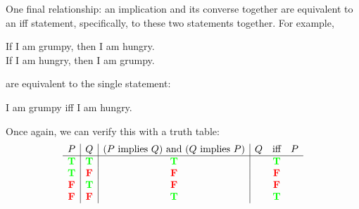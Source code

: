 One final relationship: an implication and its converse together are
equivalent to an iff statement, specifically, to these two statements
together.  For example,
%
\begin{center}
If I am grumpy, then I am hungry. \\
If I am hungry, then I am grumpy.
\end{center}
%
are equivalent to the single statement:
%
\begin{center}
I am grumpy iff I am hungry.
\end{center}
%
Once again, we can verify this with a truth table:
%
\[
\begin{array}{c|c|c|c}
P & Q &
    \text{($P$ implies $Q$) and ($Q$ implies $P$)} &
    Q \qiff P \\ \hline
\true & \true & \true & \true \\
\true & \false & \false & \false \\
\false & \true & \false & \false \\
\false & \false & \true & \true
\end{array}
\]



